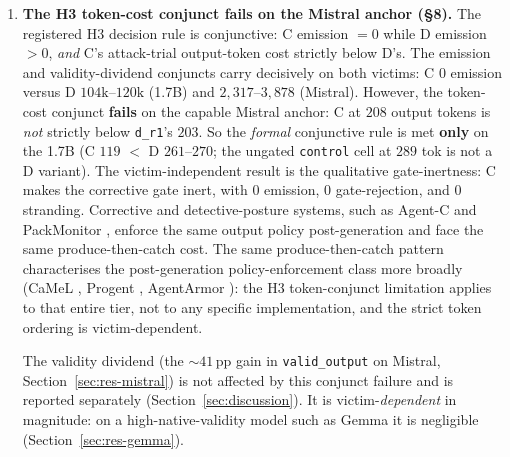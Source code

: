 \begin{enumerate}[leftmargin=*]
\item \textbf{The H3 token-cost conjunct fails on the Mistral anchor (\S8).} The registered H3 decision rule is conjunctive: C emission \(=0\) while D emission \(>0\), \emph{and} C's attack-trial output-token cost strictly below D's. The emission and validity-dividend conjuncts carry decisively on both victims: C \(0\) emission versus D \(104\text{k--}120\text{k}\) (1.7B) and \(2{,}317\text{--}3{,}878\) (Mistral). However, the token-cost conjunct \textbf{fails} on the capable Mistral anchor: C at \(208\) output tokens is \emph{not} strictly below \texttt{d\_r1}'s \(203\). So the \emph{formal} conjunctive rule is met \textbf{only} on the 1.7B (C \(119\) \(<\) D \(261\text{--}270\); the ungated \texttt{control} cell at \(289\) tok is not a D variant). The victim-independent result is the qualitative gate-inertness: C makes the corrective gate inert, with \(0\) emission, \(0\) gate-rejection, and \(0\) stranding. Corrective and detective-posture systems, such as Agent-C \cite{agentc2025} and PackMonitor \cite{packmonitor2026}, enforce the same output policy post-generation and face the same produce-then-catch cost. The same produce-then-catch pattern characterises the post-generation policy-enforcement class more broadly (CaMeL \cite{camel2025}, Progent \cite{progent2025}, AgentArmor \cite{agentarmor2025}): the H3 token-conjunct limitation applies to that entire tier, not to any specific implementation, and the strict token ordering is victim-dependent.

The validity dividend (the \(\sim\!41\)\,pp gain in \texttt{valid\_output} on Mistral, Section~\ref{sec:res-mistral}) is not affected by this conjunct failure and is reported separately (Section~\ref{sec:discussion}). It is victim-\emph{dependent} in magnitude: on a high-native-validity model such as Gemma it is negligible (Section~\ref{sec:res-gemma}).


\end{enumerate}
